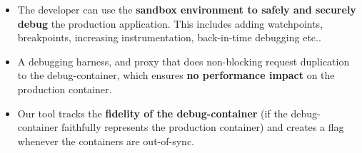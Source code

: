 \begin{itemize}[leftmargin=*]

 \item The developer can use the \textbf{sandbox environment to  safely and securely debug} the production application.
 This includes adding watchpoints, breakpoints, increasing instrumentation, back-in-time debugging  etc..  

 \item A debugging harness, and proxy that does non-blocking request duplication to the debug-container, which ensures \textbf{no performance impact} on the production container. 

 \item Our tool tracks the \textbf{fidelity of the debug-container} (if the debug-container faithfully represents the production container) and creates a flag whenever the containers are out-of-sync.



\end{itemize}


